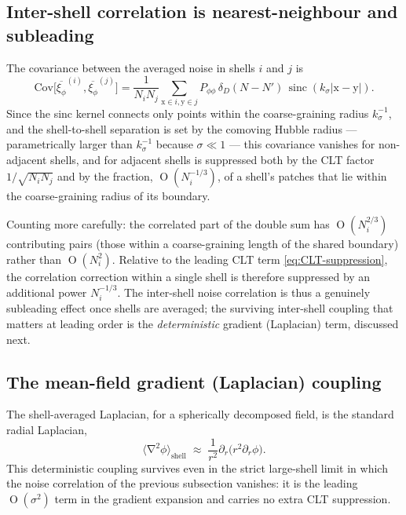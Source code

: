 \documentclass[a4paper,11pt]{article}
\DeclareMathOperator{\Or}{O}
\newcommand{\vect}[1]{\bm{\mathrm{{#1}}}}
\DeclareMathOperator{\grad}{\nabla}
\DeclareMathOperator{\sinc}{sinc}
\newenvironment{panel}{\begin{tcolorbox}[enhanced,breakable,colback=gray!10,colframe=gray!30]\small}{\end{tcolorbox}}
\newcommand{\Ny}{N}                          %
\newcommand{\field}{\phi}                    %
\newcommand{\noise}[1]{\xi_{#1}}             %
\newcommand{\Nlay}[1]{N_{#1}}                %
\newcommand{\rad}{r}                         %
\newcommand{\Pspec}[1]{P_{#1}}               %
\begin{document}
\subsection{Inter-shell correlation is nearest-neighbour and subleading}

The covariance between the averaged noise in shells $i$ and $j$ is
\begin{equation}
    \mathrm{Cov}\big[\overline{\noise{\field}}^{(i)}, \overline{\noise{\field}}^{(j)}\big]
    =
    \frac{1}{\Nlay{i}\Nlay{j}} \sum_{\vect{x}\in i, \vect{y} \in j}
    \Pspec{\field\field} \, \delta_D(\Ny-\Ny') \, \sinc(k_\sigma|\vect{x}-\vect{y}|) .
\end{equation}
Since the sinc kernel connects only points within the coarse-graining
radius $k_\sigma^{-1}$, and the shell-to-shell separation is set by the
comoving Hubble radius --- parametrically larger than $k_\sigma^{-1}$
because $\sigma \ll 1$ --- this covariance vanishes for non-adjacent shells,
and for adjacent shells is suppressed both by the CLT factor
$1/\sqrt{\Nlay{i}\Nlay{j}}$ and by the fraction, $\Or(\Nlay{i}^{-1/3})$, of a
shell's patches that lie within the coarse-graining radius of its boundary.

\begin{panel}
Counting more carefully: the correlated part of the double sum has
$\Or(\Nlay{i}^{2/3})$ contributing pairs (those within a coarse-graining
length of the shared boundary) rather than $\Or(\Nlay{i}^2)$. Relative to
the leading CLT term \eqref{eq:CLT-suppression}, the correlation correction
within a single shell is therefore suppressed by an additional power
$\Nlay{i}^{-1/3}$. The inter-shell noise correlation is thus a genuinely
subleading effect once shells are averaged; the surviving inter-shell
coupling that matters at leading order is the \emph{deterministic} gradient
(Laplacian) term, discussed next.
\end{panel}

\subsection{The mean-field gradient (Laplacian) coupling}

The shell-averaged Laplacian, for a spherically decomposed field, is the
standard radial Laplacian,
\begin{equation}
    \big\langle \grad^2 \field \big\rangle_\mathrm{shell}
    \; \approx \;
    \frac{1}{\rad^2} \partial_\rad\!\big( \rad^2 \partial_\rad \field \big) .
    \label{eq:radial-laplacian-r}
\end{equation}
This deterministic coupling survives even in the strict large-shell limit
in which the noise correlation of the previous subsection vanishes: it is
the leading $\Or(\sigma^2)$ term in the gradient expansion and carries no
extra CLT suppression.
\end{document}
